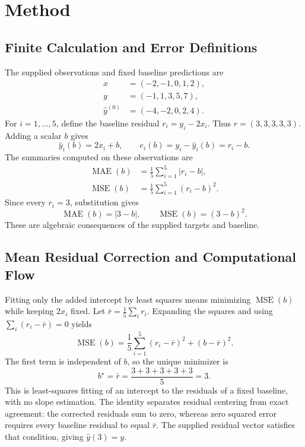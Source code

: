\documentclass[11pt]{article}
\begin{document}
\section{Method}

\subsection{Finite Calculation and Error Definitions}

The supplied observations and fixed baseline predictions are
\[
\begin{aligned}
x&=(-2,-1,0,1,2),\\
y&=(-1,1,3,5,7),\\
\hat{y}^{(0)}&=(-4,-2,0,2,4).
\end{aligned}
\]
For $i=1,\ldots,5$, define the baseline residual
$r_i=y_i-2x_i$. Thus $r=(3,3,3,3,3)$.
Adding a scalar $b$ gives
\[
\hat{y}_i(b)=2x_i+b,
\qquad
e_i(b)=y_i-\hat{y}_i(b)=r_i-b.
\]
The summaries computed on these observations are
\[
\begin{aligned}
\operatorname{MAE}(b)&=\frac{1}{5}\sum_{i=1}^{5}|r_i-b|,\\
\operatorname{MSE}(b)&=\frac{1}{5}\sum_{i=1}^{5}(r_i-b)^2.
\end{aligned}
\]
Since every $r_i=3$, substitution gives
\[
\operatorname{MAE}(b)=|3-b|,
\qquad
\operatorname{MSE}(b)=(3-b)^2.
\]
These are algebraic consequences of the supplied targets and baseline.

\subsection{Mean Residual Correction and Computational Flow}

Fitting only the added intercept by least squares means minimizing
$\operatorname{MSE}(b)$ while keeping $2x_i$ fixed. Let
$\bar r=\frac{1}{5}\sum_i r_i$. Expanding the squares and using
$\sum_i(r_i-\bar r)=0$ yields
\[
\operatorname{MSE}(b)
=
\frac{1}{5}\sum_{i=1}^{5}(r_i-\bar r)^2
+
(b-\bar r)^2.
\]
The first term is independent of $b$, so the unique minimizer is
\[
b^\star=\bar r
=\frac{3+3+3+3+3}{5}=3.
\]
This is least-squares fitting of an intercept to the residuals of a fixed baseline, with no slope estimation. The identity separates residual centering from exact agreement: the corrected residuals sum to zero, whereas zero squared error requires every baseline residual to equal $\bar r$. The supplied residual vector satisfies that condition, giving
$\hat y(3)=y$.
\end{document}
